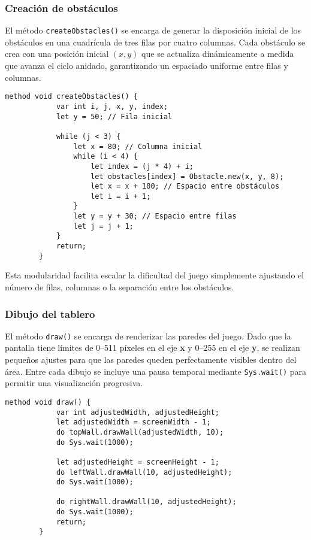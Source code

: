 \documentclass[twocolumn]{article}
\begin{document}
	\subsubsection{Creación de obstáculos}
	El método \texttt{createObstacles()} se encarga de generar la disposición inicial de los obstáculos en una cuadrícula de tres filas por cuatro columnas. Cada obstáculo se crea con una posición inicial $(x, y)$ que se actualiza dinámicamente a medida que avanza el ciclo anidado, garantizando un espaciado uniforme entre filas y columnas.
	
	\begin{lstlisting}[caption=Método de creación de obstáculos]
		method void createObstacles() {
			var int i, j, x, y, index;
			let y = 50; // Fila inicial
			
			while (j < 3) {
				let x = 80; // Columna inicial
				while (i < 4) {
					let index = (j * 4) + i;
					let obstacles[index] = Obstacle.new(x, y, 8);
					let x = x + 100; // Espacio entre obstáculos
					let i = i + 1;
				}
				let y = y + 30; // Espacio entre filas
				let j = j + 1;
			}
			return;
		}
	\end{lstlisting}
	
	Esta modularidad facilita escalar la dificultad del juego simplemente ajustando el número de filas, columnas o la separación entre los obstáculos.
	
	\subsubsection{Dibujo del tablero}
	El método \texttt{draw()} se encarga de renderizar las paredes del juego. Dado que la pantalla tiene límites de 0–511 píxeles en el eje \textbf{x} y 0–255 en el eje \textbf{y}, se realizan pequeños ajustes para que las paredes queden perfectamente visibles dentro del área. Entre cada dibujo se incluye una pausa temporal mediante \texttt{Sys.wait()} para permitir una visualización progresiva.
	
	\begin{lstlisting}[caption=Método de dibujo del tablero]
		method void draw() {
			var int adjustedWidth, adjustedHeight;
			let adjustedWidth = screenWidth - 1;
			do topWall.drawWall(adjustedWidth, 10);
			do Sys.wait(1000);
			
			let adjustedHeight = screenHeight - 1;
			do leftWall.drawWall(10, adjustedHeight);
			do Sys.wait(1000);
			
			do rightWall.drawWall(10, adjustedHeight);
			do Sys.wait(1000);
			return;
		}
	\end{lstlisting}
	
\end{document}
